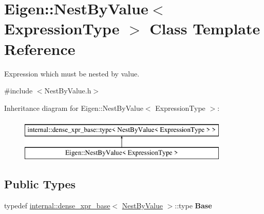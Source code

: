 \hypertarget{class_eigen_1_1_nest_by_value}{}\section{Eigen\+::Nest\+By\+Value$<$ Expression\+Type $>$ Class Template Reference}
\label{class_eigen_1_1_nest_by_value}


Expression which must be nested by value.  




{\ttfamily \#include $<$Nest\+By\+Value.\+h$>$}

Inheritance diagram for Eigen\+::Nest\+By\+Value$<$ Expression\+Type $>$\+:\begin{figure}[H]
\begin{center}
\leavevmode
\includegraphics[height=2.000000cm]{class_eigen_1_1_nest_by_value}
\end{center}
\end{figure}
\subsection*{Public Types}
\begin{DoxyCompactItemize}
\item 
\mbox{\label{class_eigen_1_1_nest_by_value_a2fcd27ed9fea5ac518b80d2ff26de783}} 
typedef \mbox{\hyperlink{struct_eigen_1_1internal_1_1dense__xpr__base}{internal\+::dense\+\_\+xpr\+\_\+base}}$<$ \mbox{\hyperlink{class_eigen_1_1_nest_by_value}{Nest\+By\+Value}} $>$\+::type {\bfseries Base}
\end{DoxyCompactItemize}

